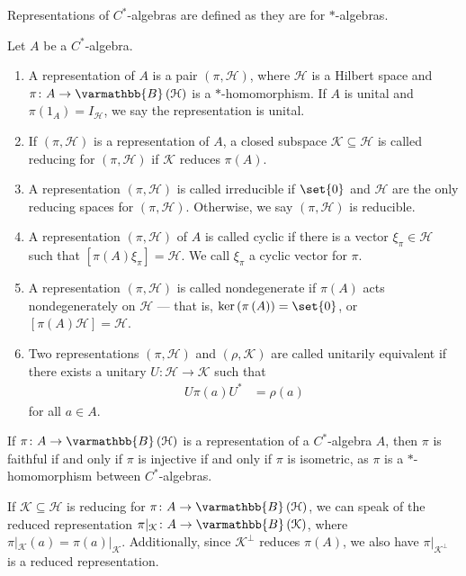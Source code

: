 \documentclass[10pt]{mypackage}
\renewcommand*{\mathbb}[1]{\varmathbb{#1}}
\newcommand{\B}{\mathbb{B}}
\begin{document}
Representations of $C^{\ast}$-algebras are defined as they are for $\ast$-algebras.
\begin{definition}
  Let $A$ be a $C^{\ast}$-algebra.
  \begin{enumerate}[(1)]
    \item A representation of $A$ is a pair $\left(\pi,\mathcal{H}\right)$, where $\mathcal{H}$ is a Hilbert space and $\pi\colon A\rightarrow \B\left(\mathcal{H}\right)$ is a $\ast$-homomorphism. If $A$ is unital and $\pi\left(1_A\right) = I_{\mathcal{H}}$, we say the representation is unital.
    \item If $\left(\pi,\mathcal{H}\right)$ is a representation of $A$, a closed subspace $\mathcal{K}\subseteq \mathcal{H}$ is called reducing for $\left(\pi,\mathcal{H}\right)$ if $\mathcal{K}$ reduces $\pi(A)$.
    \item A representation $\left(\pi,\mathcal{H}\right)$ is called irreducible if $\set{0}$ and $\mathcal{H}$ are the only reducing spaces for $\left(\pi,\mathcal{H}\right)$. Otherwise, we say $\left(\pi,\mathcal{H}\right)$ is reducible.
    \item A representation $\left(\pi,\mathcal{H}\right)$ of $A$ is called cyclic if there is a vector $\xi_{\pi}\in \mathcal{H}$ such that $\left[\pi(A)\xi_{\pi}\right] = \mathcal{H}$. We call $\xi_{\pi}$ a cyclic vector for $\pi$.
    \item A representation $\left(\pi,\mathcal{H}\right)$ is called nondegenerate if $\pi(A)$ acts nondegenerately on $\mathcal{H}$ --- that is, $\ker\left(\pi\left(A\right)\right) = \set{0}$, or $\left[\pi(A)\mathcal{H}\right] = \mathcal{H}$.
    \item Two representations $\left(\pi,\mathcal{H}\right)$ and $\left(\rho,\mathcal{K}\right)$ are called unitarily equivalent if there exists a unitary $U\colon \mathcal{H}\rightarrow \mathcal{K}$ such that
      \begin{align*}
        U\pi(a)U^{\ast} &= \rho(a)
      \end{align*}
      for all $a\in A$.
  \end{enumerate}
\end{definition}
\begin{remark}
  If $\pi\colon A\rightarrow \B\left(\mathcal{H}\right)$ is a representation of a $C^{\ast}$-algebra $A$, then $\pi$ is faithful if and only if $\pi$ is injective if and only if $\pi$ is isometric, as $\pi$ is a $\ast$-homomorphism between $C^{\ast}$-algebras.
\end{remark}
If $\mathcal{K}\subseteq \mathcal{H}$ is reducing for $\pi\colon A\rightarrow \B\left(\mathcal{H}\right)$, we can speak of the reduced representation $\pi|_{\mathcal{K}}\colon A\rightarrow \B\left(\mathcal{K}\right)$, where $\pi|_{\mathcal{K}}(a) = \pi(a)|_{\mathcal{K}}$. Additionally, since $\mathcal{K}^{\perp}$ reduces $\pi(A)$, we also have $\pi|_{\mathcal{K}^{\perp}}$ is a reduced representation.\newline
\end{document}
